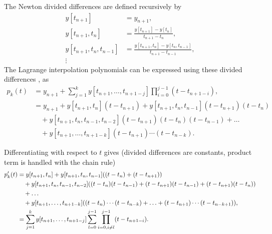 The Newton divided differences are defined recursively by
\begin{equation}
  \label{eqn:divided-diff}
  \begin{aligned}
    y[t_{n+1}] &= y_{n+1}, \\
    y[t_{n+1}, t_n] &= \frac{y[t_{n+1}] - y[t_n]}{t_{n+1} - t_n}, \\
    y[t_{n+1}, t_n, t_{n-1}] &= \frac{y[t_{n+1}, t_n] - y[t_n, t_{n-1}]}{t_{n+1} - t_{n-1}}, \\
    \vdots
  \end{aligned}
\end{equation} 
The Lagrange interpolation polynomials can be expressed using these divided differences \cite[pg. 124]{BurdenFaires}, \cite[pg. 400]{HairerNorsettWanner} as
\begin{equation}
  \label{eqn:divided-diff-intp}
  \begin{aligned}
    p_k(t) &= y_{n+1} + \sum_{j=1}^k y[t_{n+1}, \ldots, t_{n+1-j}] \prod_{i=0}^{j-1} (t - t_{n+1-i}), \\
    &= y_{n+1} + y[t_{n+1}, t_n](t - t_{n+1}) + y[t_{n+1}, t_n, t_{n-1}](t - t_{n+1})(t - t_n) \\
    &\quad + y[t_{n+1}, t_n, t_{n-1}, t_{n-2}](t - t_{n+1})(t - t_n)(t - t_{n-1}) + \ldots \\
    &\quad + y[t_{n+1}, \ldots, t_{n+1-k}](t-t_{n+1})\cdots(t-t_{n-k}).
  \end{aligned}
\end{equation}

Differentiating with respect to $t$ gives (divided differences are constants, product term is handled with the chain rule)
\begin{equation}
  \begin{aligned}
    p_k'(t) &= y[t_{n+1}, t_n] + y[t_{n+1}, t_n, t_{n-1}]{\left( (t - t_n) + (t - t_{n+1}) \right)} \\
    &\quad + y[t_{n+1}, t_n, t_{n-1}, t_{n-2}]{\left( (t - t_n)(t - t_{n-1}) + (t - t_{n+1})(t - t_{n-1}) + (t - t_{n+1})(t - t_n) \right)} \\
    &\quad + \ldots \\
    &\quad + y[t_{n+1}, \ldots, t_{n+1-k}]{\left( (t-t_{n})\cdots(t-t_{n-k}) + \ldots + (t-t_{n+1})\cdots(t-t_{n-k+1}) \right)}, \\
    &= \sum_{j=1}^k y[t_{n+1}, \ldots, t_{n+1-j}] \sum_{l=0}^{j-1} \prod_{i=0, i \neq l}^{j-1} (t - t_{n+1-i}).
  \end{aligned}
\end{equation} 

